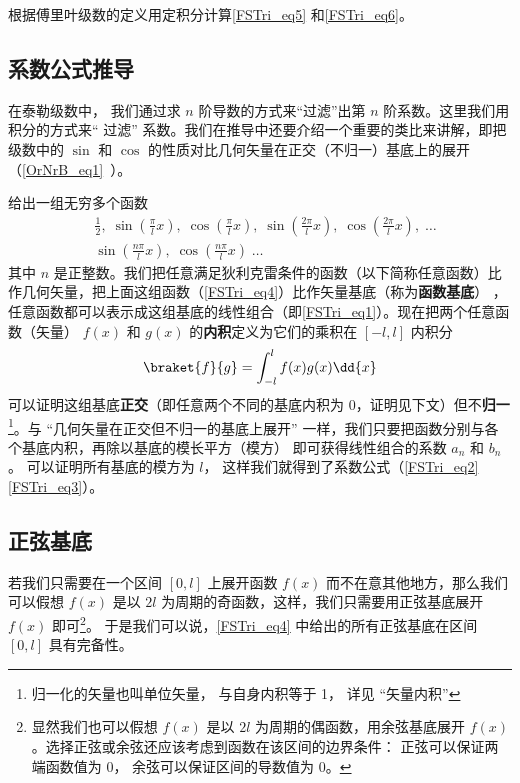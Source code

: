 \begin{exercise}{}
根据傅里叶级数的定义用定积分计算\autoref{FSTri_eq5} 和\autoref{FSTri_eq6}。
\end{exercise}

\subsection{系数公式推导}

在泰勒级数中，%
我们通过求 $n$ 阶导数的方式来“过滤”出第 $n$ 阶系数。这里我们用积分的方式来“ 过滤” 系数。我们在推导中还要介绍一个重要的类比来讲解，即把级数中的 $\sin$ 和 $\cos$ 的性质对比几何矢量在正交（不归一）基底上的展开（\autoref{OrNrB_eq1}~）。

% 

给出一组无穷多个函数
\begin{equation}\label{FSTri_eq4}
\begin{aligned}
&\frac12,\;   \sin(\frac{\pi}{l} x),\;   \cos(\frac{\pi}{l} x),\;   \sin(\frac{2\pi}{l} x),\;   \cos(\frac{2\pi}{l} x),\;   \dots\\
&\sin(\frac{n\pi}{l} x),\;   \cos(\frac{n\pi}{l} x)\;   \dots
\end{aligned}\end{equation}
其中 $n$ 是正整数。我们把任意满足狄利克雷条件的函数（以下简称任意函数）比作几何矢量，把上面这组函数（\autoref{FSTri_eq4}）比作矢量基底（称为\textbf{函数基底}）
，任意函数都可以表示成这组基底的线性组合（即\autoref{FSTri_eq1}）。现在把两个任意函数（矢量） $f(x)$ 和 $g(x)$ 的\textbf{内积}定义为它们的乘积在 $[-l,l]$ 内积分
\begin{equation}
\braket{f}{g} = \int_{-l}^{l} f(x) g(x) \dd{x}
\end{equation}
可以证明这组基底\textbf{正交}（即任意两个不同的基底内积为 0，证明见下文）但不\textbf{归一}\footnote{归一化的矢量也叫单位矢量， 与自身内积等于 1， 详见 “矢量内积”}。与 “几何矢量在正交但不归一的基底上展开” 一样，我们只要把函数分别与各个基底内积，再除以基底的模长平方（模方）
即可获得线性组合的系数 $a_n$ 和 $b_n$。 可以证明所有基底的模方为 $l$， 这样我们就得到了系数公式（\autoref{FSTri_eq2} \autoref{FSTri_eq3}）。


\subsection{正弦基底}\label{FSTri_sub3}
若我们只需要在一个区间 $[0,l]$ 上展开函数 $f(x)$ 而不在意其他地方，那么我们可以假想 $f(x)$ 是以 $2l$ 为周期的奇函数，这样，我们只需要用正弦基底展开 $f(x)$ 即可\footnote{显然我们也可以假想 $f(x)$ 是以 $2l$ 为周期的偶函数，用余弦基底展开 $f(x)$。选择正弦或余弦还应该考虑到函数在该区间的边界条件： 正弦可以保证两端函数值为 0， 余弦可以保证区间的导数值为 0。}。 于是我们可以说，\autoref{FSTri_eq4} 中给出的所有正弦基底在区间 $[0,l]$ 具有完备性。

